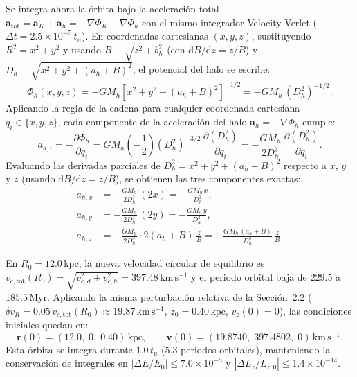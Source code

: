 \documentclass[11pt,letterpaper]{article}
\begin{document}
Se integra ahora la órbita bajo la aceleración total $\mathbf{a}_{\mathrm{tot}} = \mathbf{a}_K + \mathbf{a}_h = -\nabla\Phi_K - \nabla\Phi_h$ con el mismo integrador Velocity Verlet ($\Delta t = 2.5\times 10^{-5}\,t_u$). En coordenadas cartesianas $(x, y, z)$, sustituyendo $R^2 = x^2 + y^2$ y usando $B \equiv \sqrt{z^2 + b_h^2}$ (con $\mathrm{d}B/\mathrm{d}z = z/B$) y $D_h \equiv \sqrt{x^2 + y^2 + (a_h + B)^2}$, el potencial del halo se escribe:
\begin{equation}
    \Phi_h(x, y, z) = -G M_h\left[x^2 + y^2 + (a_h + B)^2\right]^{-1/2} = -G M_h\,(D_h^2)^{-1/2}.
\end{equation}
Aplicando la regla de la cadena para cualquier coordenada cartesiana $q_i \in \{x, y, z\}$, cada componente de la aceleración del halo $\mathbf{a}_h = -\nabla\Phi_h$ cumple:
\begin{equation}
    a_{h,i} = -\frac{\partial \Phi_h}{\partial q_i}
    = G M_h\left(-\frac{1}{2}\right)(D_h^2)^{-3/2}\,\frac{\partial (D_h^2)}{\partial q_i}
    = -\frac{G M_h}{2 D_h^3}\,\frac{\partial (D_h^2)}{\partial q_i}.
\end{equation}
Evaluando las derivadas parciales de $D_h^2 = x^2 + y^2 + (a_h + B)^2$ respecto a $x$, $y$ y $z$ (usando $\mathrm{d}B/\mathrm{d}z = z/B$), se obtienen las tres componentes exactas:
\begin{align}
    a_{h,x} &= -\frac{G M_h}{2 D_h^3}\,(2x) = -\frac{G M_h\,x}{D_h^3}, \nonumber \\
    a_{h,y} &= -\frac{G M_h}{2 D_h^3}\,(2y) = -\frac{G M_h\,y}{D_h^3}, \\
    a_{h,z} &= -\frac{G M_h}{2 D_h^3}\cdot 2(a_h + B)\,\frac{z}{B} = -\frac{G M_h\,(a_h + B)}{D_h^3}\,\frac{z}{B}. \nonumber
\end{align}

En $R_0 = 12.0\,\mathrm{kpc}$, la nueva velocidad circular de equilibrio es $v_{c,\mathrm{tot}}(R_0) = \sqrt{v_{c,d}^2 + v_{c,h}^2} = 397.48\,\mathrm{km\,s^{-1}}$ y el periodo orbital baja de $229.5$ a $185.5\,\mathrm{Myr}$. Aplicando la misma perturbación relativa de la Sección~2.2 ($\delta v_R = 0.05\,v_{c,\mathrm{tot}}(R_0) \approx 19.87\,\mathrm{km\,s^{-1}}$, $z_0 = 0.40\,\mathrm{kpc}$, $v_z(0) = 0$), las condiciones iniciales quedan en:
\begin{equation}
    \mathbf{r}(0) = (12.0,\; 0,\; 0.40)\,\mathrm{kpc}, \qquad
    \mathbf{v}(0) = (19.8740,\; 397.4802,\; 0)\,\mathrm{km\,s^{-1}}.
\end{equation}
Esta órbita se integra durante $1.0\,t_u$ ($5.3$ periodos orbitales), manteniendo la conservación de integrales en $|\Delta E/E_0| \le 7.0\times 10^{-5}$ y $|\Delta L_z/L_{z,0}| \le 1.4\times 10^{-14}$.
\end{document}
